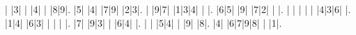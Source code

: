\begin{sudoku-block}| |3| | |4| | |8|9|.
|5| |4| |7|9| |2|3|.
| |9|7| |1|3|4| | |.
|6|5| |9| |7|2| | |.
| | | | | |4|3|6| |.
|1|4| |6|3| | | | |.
|7| |9|3| | |6|4| |.
| | |5|4| | |9| |8|.
|4| |6|7|9|8| | |1|.
\end{sudoku-block}